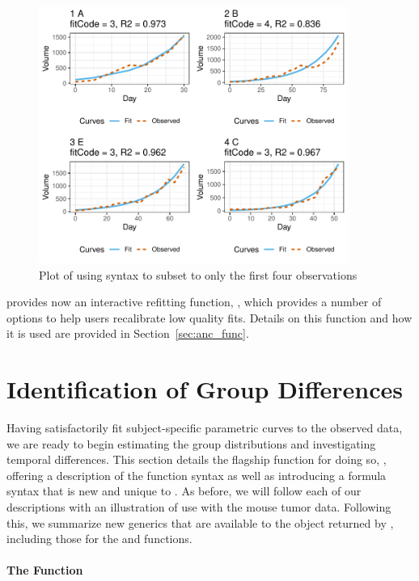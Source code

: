 \begin{figure}[H]
\centering
\includegraphics[width=0.9\textwidth]{img/mouse_fit.pdf}
\caption{Plot of  using   syntax to subset to only the first four observations}
\label{fig:plot_fits}
\end{figure}

 provides now an interactive refitting function, , which provides a number of options to help users recalibrate low quality fits. Details on this function and how it is used are provided in Section~\ref{sec:anc_func}.


\section{Identification of Group Differences}

Having satisfactorily fit subject-specific parametric curves to the observed data, we are ready to begin estimating the group distributions and investigating temporal differences. This section details the flagship function for doing so, , offering a description of the function syntax as well as introducing a formula syntax that is new and unique to . As before, we will follow each of our descriptions with an illustration of use with the mouse tumor data. Following this, we summarize new generics that are available to the object returned by , including those for the  and  functions.


\paragraph{The  Function}

